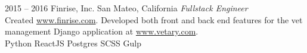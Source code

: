 \documentclass[]{friggeri-cv} %
\begin{document}
\begin{entrylist}
\entry
{2015 -- 2016}
{Finrise, Inc.}
{San Mateo, California}
{\emph{Fullstack Engineer} \\
Created \href{https://www.finrise.com}{www.finrise.com}.
Developed both front and back end features for the vet management Django application at \href{https://www.vetary.com}{www.vetary.com}.\\
Python \mydot ReactJS \mydot Postgres \mydot SCSS \mydot Gulp}

%
%


\end{entrylist}
\end{document}

